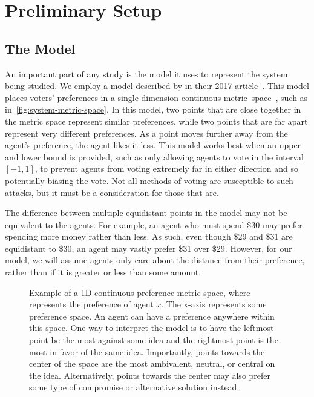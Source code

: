 \section{Preliminary Setup}\label{sec:preliminary-setup}

\subsection{The Model}\label{subsec:the-model}
An important part of any study is the model it uses to represent the system being
studied.
We employ a model described by  in their 2017
article~\cite{Cohensius2017}.
This model places voters' preferences in a single-dimension continuous
metric~space~\systemspace, such as in~\autoref{fig:system-metric-space}.
In this model, two points that are close together in the metric space represent
similar preferences, while two points that are far apart represent very different
preferences.
As a point moves further away from the agent's preference, the agent likes it less.
This model works best when an upper and lower bound is provided, such as only
allowing agents to vote in the interval $[-1, 1]$, to prevent agents from voting
extremely far in either direction and so potentially biasing the vote.
Not all methods of voting are susceptible to such attacks, but it must be a
consideration for those that are.

The difference between multiple equidistant points in the model may not be equivalent
to the agents.
For example, an agent who must spend \$30 may prefer spending more money rather than
less.
As such, even though \$29 and \$31 are equidistant to \$30, an agent may vastly
prefer \$31 over \$29.
However, for our model, we will assume agents only care about the distance from their
preference, rather than if it is greater or less than some amount.

\begin{figure}[htbp]
    \centering
    
    \caption{
        Example of a 1D continuous preference metric space, where  represents
        the preference of agent $x$.
        The x-axis represents some preference space.
        An agent can have a preference anywhere within this space.
        One way to interpret the model is to have the leftmost point be the most
        against some idea and the rightmost point is the most in favor of the same idea.
        Importantly, points towards the center of the space are the most ambivalent,
        neutral, or central on the idea.
        Alternatively, points towards the center may also prefer some type of
        compromise or alternative solution instead.
    }
    \label{fig:system-metric-space}
\end{figure}

